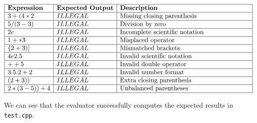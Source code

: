 \documentclass[a4paper]{article}
\begin{document}
\[
\begin{array}{|l|l|p{7cm}|}
    \hline
\textbf{Expression} & \textbf{Expected Output} & \textbf{Description} \\
\hline
3 + (4 * 2 & ILLEGAL & Missing closing parenthesis \\
\hline
5 / (3 - 3) & ILLEGAL & Division by zero \\
\hline
2e & ILLEGAL & Incomplete scientific notation \\
\hline
1 + * 3 & ILLEGAL & Misplaced operator \\
\hline
\{2 + 3)] & ILLEGAL & Mismatched brackets \\
\hline
4e2.5 & ILLEGAL & Invalid scientific notation \\
\hline
++5 & ILLEGAL & Invalid double operator \\
\hline
3.5.2 + 2 & ILLEGAL & Invalid number format \\
\hline
(2 + 3)) & ILLEGAL & Extra closing parenthesis \\
\hline
2 * (3 - 5)) + 4 & ILLEGAL & Unbalanced parentheses \\
\hline

\end{array}
\]

We can see that the evaluator successfully computes the expected results in \texttt{test.cpp}.
\end{document}
